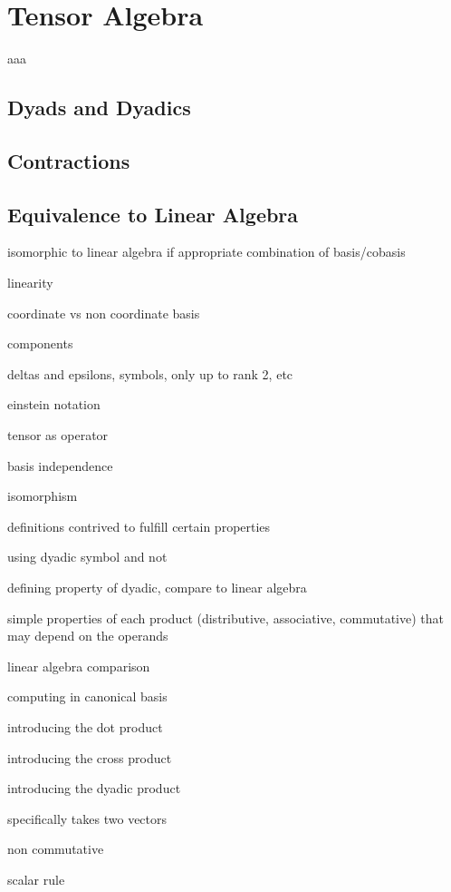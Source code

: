 \chapter{Tensor Algebra}
\label{chapter:Tensor-Algebra}


aaa

\section{Dyads and Dyadics}

\section{Contractions}

\section{Equivalence to Linear Algebra}

isomorphic to linear algebra if appropriate combination of basis/cobasis

linearity

coordinate vs non coordinate basis

components

deltas and epsilons, symbols, only up to rank 2, etc

einstein notation

tensor as operator

basis independence

isomorphism

definitions contrived to fulfill certain properties

using dyadic symbol and not

defining property of dyadic, compare to linear algebra

simple properties of each product (distributive, associative, commutative) that may depend on the operands

linear algebra comparison

computing in canonical basis

introducing the dot product

introducing the cross product

introducing the dyadic product

specifically takes two vectors

non commutative

scalar rule

